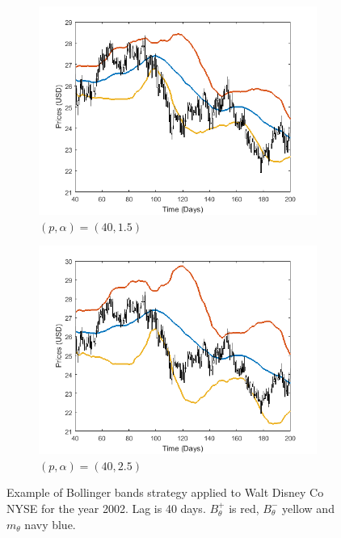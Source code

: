 \documentclass[11pt,a4,twosided,singlespacing,titlepagenumber=on]{scrreprt}
\numberwithin{equation}{chapter} %
\theoremstyle{remark}
\begin{document}
\begin{figure}[H]
    \centering
    \begin{subfigure}[t]{0.49\textwidth}
        \centering
        \includegraphics[width=1\textwidth]{bollinger/3}
        \caption{$(p, \alpha) = (40,1.5)$}
        \label{bollinger3}
    \end{subfigure}
    \begin{subfigure}[t]{0.49\textwidth}
        \centering
        \includegraphics[width=1\textwidth]{bollinger/4}
        \caption{$(p, \alpha) = (40,2.5)$}
        \label{bollinger4}
    \end{subfigure}
    \caption{Example of Bollinger bands strategy applied to Walt Disney Co NYSE for the year 2002. Lag is 40 days. $B^+_\theta$ is red, $B^-_\theta$ yellow and $m_\theta$ navy blue.}
    \label{bollinger_bands_intro_2}
\end{figure}
\end{document}
